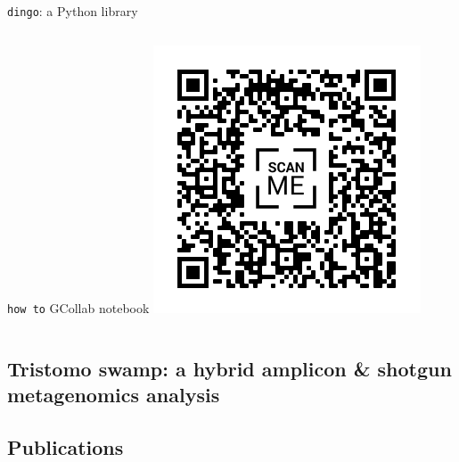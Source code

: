 \documentclass{beamer}
\begin{document}
\begin{frame}{\texttt{dingo}: a Python library }
\begin{columns}[onlytextwidth]
            \begin{center}
               \texttt{how to} GCollab notebook
               \includegraphics[scale=0.3]{ ../met_nets/resources//dingo_collab_transparent.png}               
            \end{center}
 
      \end{columns}

   \end{frame}




   \begin{darkframes}
      \section{
         Tristomo swamp: a hybrid amplicon \& shotgun metagenomics analysis 
      }
   \end{darkframes}



   \begin{darkframes}
      \section{Publications}
   \end{darkframes}
\end{document}
